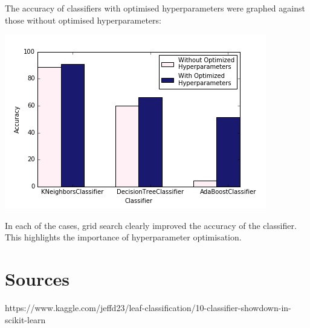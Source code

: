 \documentclass{article}
\begin{document}
The accuracy of classifiers with optimised hyperparameters were graphed against those without optimised hyperparameters:

\includegraphics[scale=0.7]{acc_class}

In each of the cases, grid search clearly improved the accuracy of the classifier. This highlights the importance of hyperparameter optimisation. 





\section{Sources}


https://www.kaggle.com/jeffd23/leaf-classification/10-classifier-showdown-in-scikit-learn
\end{document}
